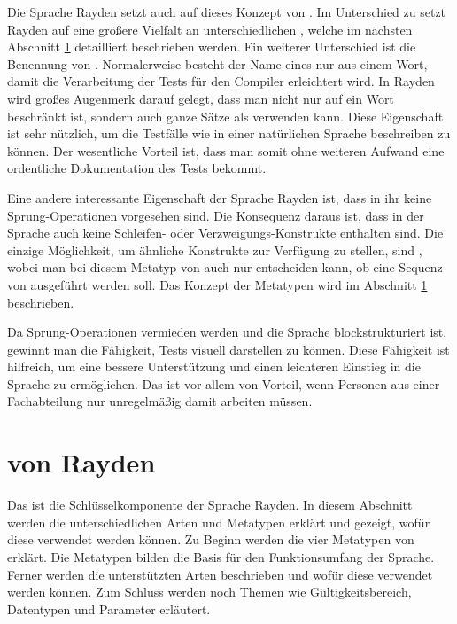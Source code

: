 \SuperPar
Die Sprache Rayden setzt auch auf dieses Konzept von . Im Unterschied zu  setzt Rayden auf eine größere Vielfalt an unterschiedlichen , welche im nächsten Abschnitt \ref{cha:Keyword} detailliert beschrieben werden. Ein weiterer Unterschied ist die Benennung von . Normalerweise besteht der Name eines  nur aus einem Wort, damit die Verarbeitung der Tests für den Compiler erleichtert wird. In Rayden wird großes Augenmerk darauf gelegt, dass man nicht nur auf ein Wort beschränkt ist, sondern auch ganze Sätze als  verwenden kann. Diese Eigenschaft ist sehr nützlich, um die Testfälle wie in einer natürlichen Sprache beschreiben zu können. Der wesentliche Vorteil ist, dass man somit ohne weiteren Aufwand eine ordentliche Dokumentation des Tests bekommt.

\SuperPar
Eine andere interessante Eigenschaft der Sprache Rayden ist, dass in ihr keine Sprung-Operationen vorgesehen sind. Die Konsequenz daraus ist, dass in der Sprache auch keine Schleifen- oder Verzweigungs-Konstrukte enthalten sind. Die einzige Möglichkeit, um ähnliche Konstrukte zur Verfügung zu stellen, sind , wobei man bei diesem Metatyp von  auch nur entscheiden kann, ob eine Sequenz von  ausgeführt werden soll. Das Konzept der Metatypen wird im Abschnitt \ref{cha:Keyword} beschrieben. 

\SuperPar
Da Sprung-Operationen vermieden werden und die Sprache blockstrukturiert ist, gewinnt man die Fähigkeit, Tests visuell darstellen zu können. Diese Fähigkeit ist hilfreich, um eine bessere Unterstützung und einen leichteren Einstieg in die Sprache zu ermöglichen. Das ist vor allem von Vorteil, wenn Personen aus einer Fachabteilung nur unregelmäßig damit arbeiten müssen. 


\section{ von Rayden}
\label{cha:Keyword}

Das  ist die Schlüsselkomponente der Sprache Rayden. In diesem Abschnitt werden die unterschiedlichen Arten und Metatypen erklärt und gezeigt, wofür diese verwendet werden können. Zu Beginn werden die vier Metatypen von  erklärt. Die Metatypen bilden die Basis für den Funktionsumfang der Sprache. Ferner werden die unterstützten Arten beschrieben und wofür diese verwendet werden können. Zum Schluss werden noch Themen wie Gültigkeitsbereich, Datentypen und Parameter erläutert.

